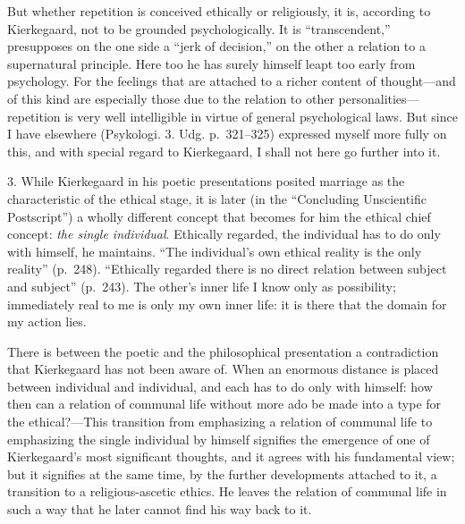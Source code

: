 \documentclass[12pt,a4paper]{book}
\newcommand{\opage}[1]{\marginnote{\footnotesize\textit{[#1]}}}
\begin{document}
But whether repetition is conceived ethically or religiously, it is,
according to Kierkegaard, not to be grounded psychologically. It is
``transcendent,'' presupposes on the one side a ``jerk of decision,'' on
the other a relation to a supernatural principle. Here too he has surely
himself leapt too early from psychology. For the feelings that are
attached to a richer content of thought---and of this kind are especially
those due to the relation to other personalities---repetition is very well
intelligible in virtue of general psychological laws. But since I have
elsewhere (Psykologi. 3. Udg. p.~321--325) expressed myself more fully on
this, and with special regard to Kierkegaard, I shall not here go further
into it.

3. While Kierkegaard in his poetic presentations posited marriage as the
characteristic of the ethical stage, it is later (in the ``Concluding
Unscientific Postscript'') a wholly different concept that becomes for
him the ethical chief concept: \textit{the single individual}. Ethically
regarded, the individual has to do only with himself, he maintains.
``The individual's own ethical reality is the only reality'' (p.~248).
``Ethically regarded there is no direct relation between subject and
subject'' (p.~243). The other's inner life I know only as possibility;
immediately real to me is only my own inner life: it is there that the
domain for my action lies.

There is between the poetic and the philosophical presentation a
contradiction that Kierkegaard has not been aware of. When an enormous
distance is placed between individual and individual, and each has to do
only with himself: how then can a relation of communal life without more
ado be made into a type for the ethical?---This transition from
emphasizing a relation of communal life to emphasizing the single
\opage{99}individual by himself signifies the emergence of one of
Kierkegaard's most significant thoughts, and it agrees with his
fundamental view; but it signifies at the same time, by the further
developments attached to it, a transition to a religious-ascetic ethics.
He leaves the relation of communal life in such a way that he later cannot
find his way back to it.
\end{document}

